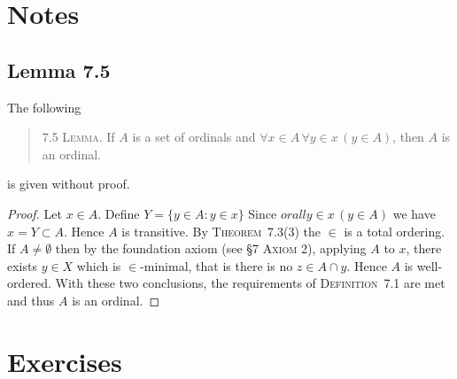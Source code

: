 
\section{Notes}

\subsection{Lemma 7.5}

The following 
\begin{quote}
  7.5 \textsc{Lemma.} If $A$ is a set of ordinals
  and \(\forall x\in A\, \forall y\in x\, (y\in A)\),
  then $A$ is an ordinal.
\end{quote}
is given without proof.
\begin{proof}
Let \(x\in A\).
Define \(Y=\{y\in A: y\in x\}\)
Since \(orall y\in x\, (y\in A)\) we have \(x=Y\subset A\).
Hence $A$ is transitive.
By \textsc{Theorem}~7.3(3) the \(\in\) is a total ordering.
If \(A\neq\emptyset\) then by the foundation axiom (see \S7 \textsc{Axiom 2}),
applying $A$ to $x$, there exists \(y\in X\)
which is \(\in\)-minimal, that is there is no \(z\in A\cap y\).
Hence $A$ is well-ordered.
With these two conclusions, the requirements of \textsc{Definition}~7.1
are met and thus $A$ is an ordinal.
\end{proof}


\section{Exercises}

